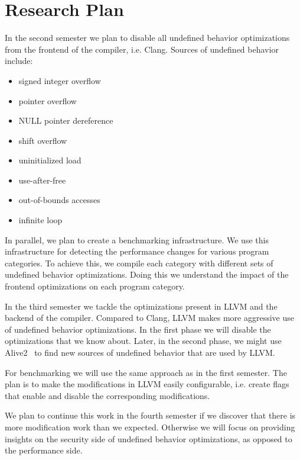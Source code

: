 \section{Research Plan} \label{sec:rp}

In the second semester we plan to disable all undefined behavior
optimizations from the frontend of the compiler, i.e. Clang. Sources of
undefined behavior include:
\begin{itemize}
  \item signed integer overflow
  \item pointer overflow
  \item NULL pointer dereference
  \item shift overflow
  \item uninitialized load
  \item use-after-free
  \item out-of-bounds accesses
  \item infinite loop
\end{itemize}

In parallel, we plan to create a benchmarking infrastructure. We use
this infrastructure for detecting the performance changes for various
program categories. To achieve this, we compile each category with
different sets of undefined behavior optimizations. Doing this we
understand the impact of the frontend optimizations on each program
category.

In the third semester we tackle the optimizations present in LLVM and
the backend of the compiler. Compared to Clang, LLVM makes more
aggressive use of undefined behavior optimizations. In the first phase
we will disable the optimizations that we know about. Later, in the
second phase, we might use Alive2~\cite{lopes2021alive2} to find new
sources of undefined behavior that are used by LLVM.

For benchmarking we will use the same approach as in the first semester.
The plan is to make the modifications in LLVM easily configurable, i.e.
create flags that enable and disable the corresponding modifications.

We plan to continue this work in the fourth semester if we discover that
there is more modification work than we expected. Otherwise we will
focus on providing insights on the security side of undefined behavior
optimizations, as opposed to the performance side.
